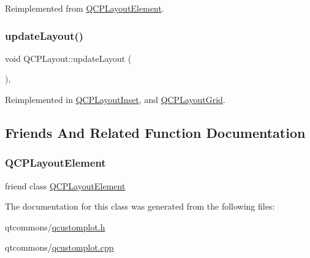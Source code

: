 Reimplemented from \mbox{\hyperlink{class_q_c_p_layout_element_a929c2ec62e0e0e1d8418eaa802e2af9b}{Q\+C\+P\+Layout\+Element}}.

\mbox{\label{class_q_c_p_layout_a165c77f6287ac92e8d03017ad913378b}} 
\subsubsection{\texorpdfstring{updateLayout()}{updateLayout()}}
{\footnotesize\ttfamily void Q\+C\+P\+Layout\+::update\+Layout (\begin{DoxyParamCaption}{ }\end{DoxyParamCaption})\hspace{0.3cm}{\ttfamily [protected]}, {\ttfamily [virtual]}}



Reimplemented in \mbox{\hyperlink{class_q_c_p_layout_inset_a493526b922ea66a75c45ef1842446988}{Q\+C\+P\+Layout\+Inset}}, and \mbox{\hyperlink{class_q_c_p_layout_grid_a6cf43f14d3fa335fd8758561ccf1f78c}{Q\+C\+P\+Layout\+Grid}}.



\subsection{Friends And Related Function Documentation}
\mbox{\label{class_q_c_p_layout_a0790750c7e7f14fdbd960d172655b42b}} 
\subsubsection{\texorpdfstring{QCPLayoutElement}{QCPLayoutElement}}
{\footnotesize\ttfamily friend class \mbox{\hyperlink{class_q_c_p_layout_element}{Q\+C\+P\+Layout\+Element}}\hspace{0.3cm}{\ttfamily [friend]}}



The documentation for this class was generated from the following files\+:\begin{DoxyCompactItemize}
\item 
qtcommons/\mbox{\hyperlink{qcustomplot_8h}{qcustomplot.\+h}}\item 
qtcommons/\mbox{\hyperlink{qcustomplot_8cpp}{qcustomplot.\+cpp}}\end{DoxyCompactItemize}
